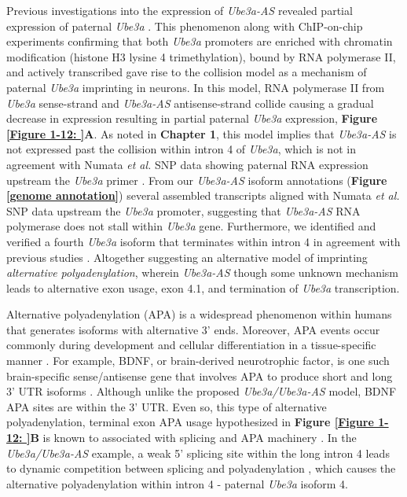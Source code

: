 Previous investigations into the expression of \textit{Ube3a-AS} revealed partial expression of paternal \textit{Ube3a} \cite{Meng2012,Numata2011}. This phenomenon along with ChIP-on-chip experiments confirming that both \textit{Ube3a} promoters are enriched with chromatin modification (histone H3 lysine 4 trimethylation), bound by RNA polymerase II, and actively transcribed gave rise to the collision model as a mechanism of paternal \textit{Ube3a} \cite{Meng2013} imprinting in neurons. In this model, RNA polymerase II from \textit{Ube3a} sense-strand and \textit{Ube3a-AS} antisense-strand collide causing a gradual decrease in expression resulting in partial paternal \textit{Ube3a} expression, \textbf{Figure \ref{Figure 1-12: }A}. As noted in \textbf{Chapter 1}, this model implies that \textit{Ube3a-AS} is not expressed past the collision within intron 4 of \textit{Ube3a}, which is not in agreement with Numata \textit{et al.} SNP data showing paternal RNA expression upstream the \textit{Ube3a} primer \cite{Numata2011}. From our \textit{Ube3a-AS} isoform annotations (\textbf{Figure \ref{genome annotation}}) several assembled transcripts aligned with Numata \textit{et al.} SNP data upstream the \textit{Ube3a} promoter, suggesting that \textit{Ube3a-AS} RNA polymerase does not stall within \textit{Ube3a} gene. Furthermore, we identified and verified a fourth \textit{Ube3a} isoform that terminates within intron 4 in agreement with previous studies \cite{Meng2012,Numata2011}. Altogether suggesting an alternative model of imprinting \textit{alternative polyadenylation}, wherein \textit{Ube3a-AS} though some unknown mechanism leads to alternative exon usage, exon 4.1, and termination of \textit{Ube3a} transcription.

Alternative polyadenylation (APA) is a widespread phenomenon within humans that generates isoforms with alternative 3' ends. Moreover, APA events occur commonly during development and cellular differentiation in a tissue-specific manner \cite{Zhang2005}. For example, BDNF, or brain-derived neurotrophic factor, is one such brain-specific sense/antisense gene that involves APA to produce short and long 3' UTR isoforms \cite{Timmusk1993,Lau2010}. Although unlike the proposed \textit{Ube3a/Ube3a-AS} model, BDNF APA sites are within the 3' UTR. Even so, this type of alternative polyadenylation, terminal exon APA usage hypothesized in \textbf{Figure \ref{Figure 1-12: }B} is known to associated with splicing and APA machinery \cite{Elkon2013}. In the \textit{Ube3a/Ube3a-AS} example, a weak 5' splicing site within the long intron 4 leads to dynamic competition between splicing and polyadenylation \cite{Wang2008}, which causes the alternative polyadenylation within intron 4 - paternal \textit{Ube3a} isoform 4. 


